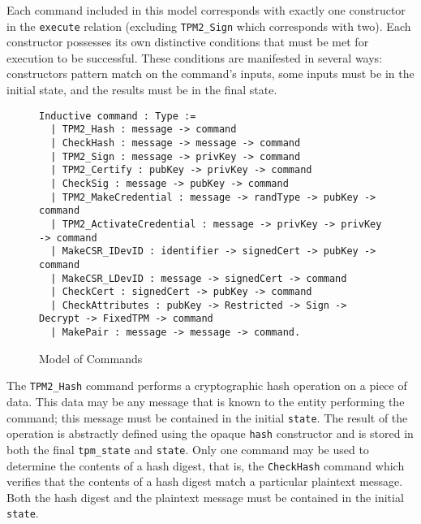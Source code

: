 Each command included in this model corresponds with exactly one constructor in the \verb|execute| relation (excluding \verb|TPM2_Sign| which corresponds with two). Each constructor possesses its own distinctive conditions that must be met for execution to be successful. These conditions are manifested in several ways: constructors pattern match on the command's inputs, some inputs must be in the initial state, and the results must be in the final state. 

\begin{figure}[h]
  \begin{lstlisting}[language=Coq]
  Inductive command : Type :=
  | TPM2_Hash : message -> command
  | CheckHash : message -> message -> command
  | TPM2_Sign : message -> privKey -> command
  | TPM2_Certify : pubKey -> privKey -> command
  | CheckSig : message -> pubKey -> command
  | TPM2_MakeCredential : message -> randType -> pubKey -> command
  | TPM2_ActivateCredential : message -> privKey -> privKey -> command
  | MakeCSR_IDevID : identifier -> signedCert -> pubKey -> command
  | MakeCSR_LDevID : message -> signedCert -> command
  | CheckCert : signedCert -> pubKey -> command
  | CheckAttributes : pubKey -> Restricted -> Sign -> Decrypt -> FixedTPM -> command
  | MakePair : message -> message -> command.
  \end{lstlisting}
  \caption{Model of Commands}
  \end{figure}




The \verb|TPM2_Hash| command performs a cryptographic hash operation on a piece of data. This data may be any message that is known to the entity performing the command; this message must be contained in the initial \verb|state|. The result of the operation is abstractly defined using the opaque \verb|hash| constructor and is stored in both the final \verb|tpm_state| and \verb|state|. Only one command may be used to determine the contents of a hash digest, that is, the \verb|CheckHash| command which verifies that the contents of a hash digest match a particular plaintext message. Both the hash digest and the plaintext message must be contained in the initial \verb|state|.


